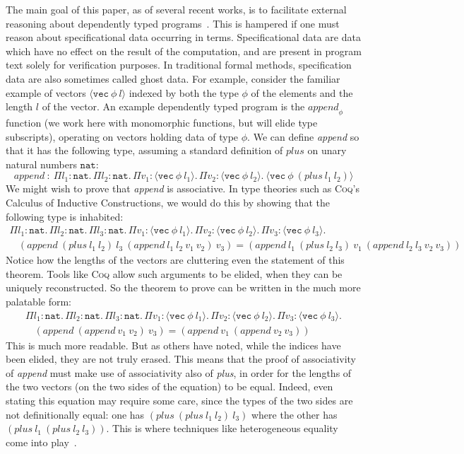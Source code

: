 \documentclass[copyright]{eptcs}
\newcommand{\vc}[0]{\texttt{vec}}
\newcommand{\nat}[0]{\texttt{nat}}
\begin{document}
The main goal of this paper, as of several recent works, is to
facilitate external reasoning about dependently typed
programs~\cite{mishra-linger+08,barras+08}.  This is hampered if one
must reason about specificational data occurring in terms.
Specificational data are data which have no effect on the result of
the computation, and are present in program text solely for
verification purposes.  In traditional formal methods, specification
data are also sometimes called ghost data.  For example, consider the
familiar example of vectors $\langle\vc\ \phi\ l\rangle$ indexed by
both the type $\phi$ of the elements and the length $l$ of the vector.
An example dependently typed program is the $\textit{append}_\phi$
function (we work here with monomorphic functions, but will elide type
subscripts), operating on vectors holding data of type $\phi$.  We can
define \textit{append} so that it has the following type, assuming a
standard definition of $\textit{plus}$ on unary natural numbers
$\nat$:
\[
\textit{append} \ : \ \Pi l_1:\nat.\,\Pi l_2:\nat.\,\Pi v_1:\langle\vc\ \phi\ l_1\rangle.\,\Pi v_2:\langle\vc\ \phi\ l_2\rangle.\  \langle\vc\ \phi\ (\textit{plus}\ l_1\ l_2)\rangle
\]
\noindent We might wish to prove that \textit{append} is associative.
In type theories such as \textsc{Coq}'s Calculus of Inductive
Constructions, we would do this by showing that the following type is
inhabited:
\[
\begin{array}{l}
\Pi l_1:\nat.\, \Pi l_2:\nat.\,\Pi l_3:\nat.\,
\Pi v_1:\langle \vc\ \phi\ l_1\rangle.\, \Pi v_2:\langle \vc\ \phi\ l_2\rangle. \, \Pi v_3:\langle \vc\ \phi\ l_3\rangle.\\
\ \ \ \ (\textit{append}\ (\textit{plus}\ l_1\ l_2)\ l_3\ (\textit{append}\ l_1\ l_2\ v_1\ v_2)\ v_3) 
= (\textit{append}\ l_1\ (\textit{plus}\ l_2\ l_3)\ v_1\ (\textit{append}\ l_2\ l_3\ v_2\ v_3))
\end{array}
\]
\noindent Notice how the lengths of the vectors are cluttering even
the statement of this theorem.  Tools like \textsc{Coq} allow such
arguments to be elided, when they can be uniquely reconstructed.  So
the theorem to prove can be written in the much more palatable form:
\[
\begin{array}{l}
\Pi l_1:\nat.\, \Pi l_2:\nat. \, \Pi l_3:\nat.\,
\Pi v_1:\langle \vc\ \phi\ l_1\rangle.\, \Pi v_2:\langle \vc\ \phi\ l_2\rangle.\, \Pi v_3:\langle \vc\ \phi\ l_3\rangle.\\
\ \ \ \ (\textit{append}\ (\textit{append}\ v_1\ v_2)\ v_3) 
= (\textit{append}\ v_1\ (\textit{append}\ v_2\ v_3))
\end{array}
\]
\noindent This is much more readable.  But as others have noted, while
the indices have been elided, they are not truly erased.  This means
that the proof of associativity of \textit{append} must make use of
associativity also of \textit{plus}, in order for the lengths of the
two vectors (on the two sides of the equation) to be equal.  Indeed,
even stating this equation may require some care, since the types of
the two sides are not definitionally equal: one has
$(\textit{plus}\ (\textit{plus}\ l_1\ l_2)\ l_3)$ where the other has
$(\textit{plus}\ l_1\ (\textit{plus}\ l_2\ l_3))$.  This is where
techniques like heterogeneous equality come into
play~\cite{mcbride99}.
\end{document}
